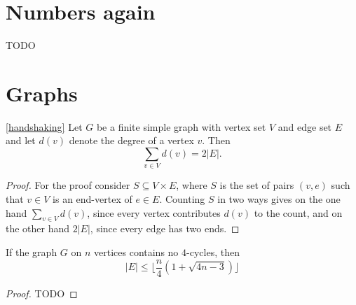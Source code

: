 \section{Numbers again}
 TODO

\section{Graphs}

\begin{lemma}[Handshaking]
  \ref{handshaking}
  \leanok
  Let $G$ be a finite simple graph with vertex set $V$ and edge set $E$ and let
  $d(v)$ denote the degree of a vertex $v$. Then
  \[
  \sum_{v\in V}d(v) = 2|E|.
  \]
\end{lemma}
\begin{proof}
\leanok
For the proof consider $S \subseteq V \times E$, where $S$ is
the set of pairs $(v, e)$ such that $v \in V$ is an end-vertex
of $e \in E$. Counting $S$ in two ways gives on the one hand
$\sum_{v \in V} d(v)$, since every vertex contributes $d(v)$
to the count, and on the other hand $2|E|$, since every edge
has two ends.
\end{proof}

\begin{theorem}
  \label{ch28theorem}
  If the graph $G$ on $n$ vertices contains no $4$-cycles, then
  \[
  |E| \le \lfloor\frac{n}{4}(1 + \sqrt{4n - 3})\rfloor
  \]
\end{theorem}
\begin{proof}
  TODO
\end{proof}

